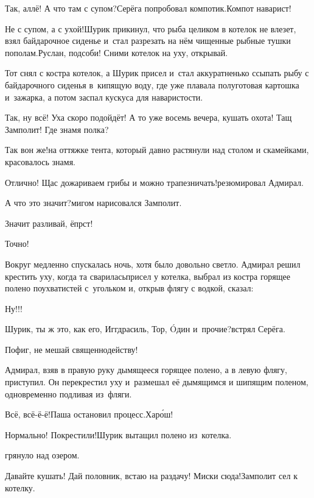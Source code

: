 
\diagdash Так, аллё! А что там с супом?\mdash Серёга попробовал компотик.\mdash Компот наварист!

\diagdash Не с супом, а с ухой!\mdash Шурик прикинул, что рыба целиком в котелок не влезет, взял байдарочное сиденье и~стал разрезать на нём чищенные рыбные тушки пополам.\mdash Руслан, подсоби! Сними котелок на уху, открывай.

Тот снял с костра котелок, а Шурик присел и~стал аккуратненько ссыпать рыбу с байдарочного сиденья в~кипящую воду, где уже плавала полуготовая картошка и~зажарка, а потом заспал кус\sdash куса для наваристости.

\diagdash Так, ну всё! Уха скоро подойдёт! А то уже восемь вечера, кушать охота! Тащ Замполит! Где знамя полка? 

\diagdash Так вон же!\mdash на оттяжке тента, который давно растянули над столом и скамейками, красовалось знамя.

\diagdash Отлично! Щас дожариваем грибы и можно трапезничать!\mdash резюмировал Адмирал.

\diagdash А что это значит?\mdash мигом нарисовался Замполит.

\diagdash Значит разливай, ёпрст!

\diagdash Точно!

Вокруг медленно спускалась ночь, хотя было довольно светло. Адмирал решил крестить уху, когда та сварилась\mdash присел у котелка, выбрал из костра горящее полено поухватистей с~угольком и, открыв флягу с водкой, сказал:

\diagdash Ну!!!

\diagdash Шурик, ты ж это, как его, Иггдрасиль, Тор, {\'{O}}дин и~прочие?\mdash встрял Серёга.

\diagdash Пофиг, не мешай священнодейству!

Адмирал, взяв в правую руку дымящееся горящее полено, а в левую флягу, приступил. Он перекрестил уху и~размешал её дымящимся и шипящим поленом, одновременно подливая из~фляги.

\diagdash Всё, всё-ё-ё!\mdash Паша остановил процесс.\mdash Хар{\'о}ш!

\diagdash Нормально! Покрестили!\mdash Шурик вытащил полено из~котелка.

\mdash грянуло над озером.

\diagdash Давайте кушать! Дай половник, встаю на раздачу! Миски сюда!\mdash Замполит сел к котелку.

